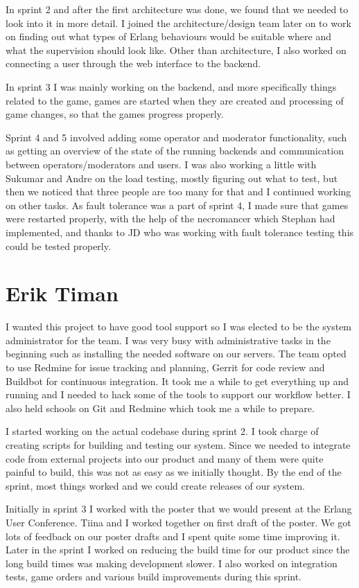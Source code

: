\documentclass[11pt,a4paper]{report}
\begin{document}
In sprint 2 and after the first architecture was done, we found that we
needed to look into it in more detail. I joined the architecture/design team
later on to work on finding out what types of Erlang behaviours would be
suitable where and what the supervision should look like. Other than
architecture, I also worked on connecting a user through the web interface to
the backend.

In sprint 3 I was mainly working on the backend, and more specifically things
related to the game, games are started when they are created and processing of
game changes, so that the games progress properly.

Sprint 4 and 5 involved adding some operator and moderator functionality, such
as getting an overview of the state of the running backends and communication
between operators/moderators and users. I was also working a little with Sukumar
and Andre on the load testing, mostly figuring out what to test, but then we
noticed that three people are too many for that and I continued working on other
tasks.
As fault tolerance was a part of sprint 4, I made sure that games were restarted
properly, with the help of the necromancer which Stephan had implemented, and
thanks to JD who was working with fault tolerance testing this could be tested
properly.
\section{Erik Timan}
I wanted this project to have good tool support so I was elected to be the
system administrator for the team. I was very busy with administrative tasks in
the beginning such as installing the needed software on our servers. The team
opted to use Redmine for issue tracking and planning, Gerrit for code review and
Buildbot for continuous integration. It took me a while to get everything up and
running and I needed to hack some of the tools to support our workflow better. I
also held schools on Git and Redmine which took me a while to prepare.

I started working on the actual codebase during sprint 2. I took charge of
creating scripts for building and testing our system. Since we needed to
integrate code from external projects into our product and many of them were
quite painful to build, this was not as easy as we initially thought. By the end
of the sprint, most things worked and we could create releases of our system.

Initially in sprint 3 I worked with the poster that we would present at the
Erlang User Conference. Tiina and I worked together on first draft of the
poster. We got lots of feedback on our poster drafts and I spent quite some time
improving it. Later in the sprint I worked on reducing the build time for our
product since the long build times was making development slower. I also worked
on integration tests, game orders and various build improvements during this
sprint.
\end{document}
